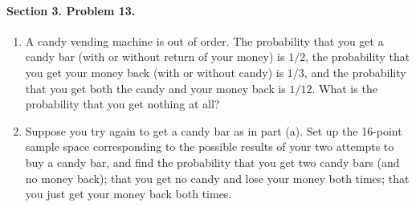 \documentclass[10pt]{article}
\begin{document}
        \paragraph{Section 3. Problem 13.} 
        \begin{enumerate}
                \item A candy vending machine is out of order. The probability that you get a candy bar (with or without return of your money) is
                $1 /2$, the probability that you get your money back (with or without candy) is $1 /3$, and the probability that you
                get both the candy and your money back is $1 /12$. What is the probability that you get nothing at all?

                \item Suppose you try again to get a candy bar as in part (a).
                Set up the 16-point sample space corresponding to the possible results of your two attempts to buy a candy bar, and find
                the probability that you get two candy bars (and no money back); that you get no candy and lose your money both times;
                that you just get your money back both times.
        \end{enumerate}
\end{document}
